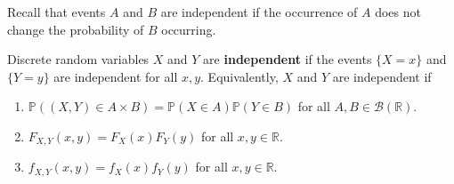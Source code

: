 \documentclass{huhtakm-template-book}
\newcommand{\prob}{\mathbb{P}}
\begin{document}
Recall that events $A$ and $B$ are independent if the occurrence of $A$ does not change the probability of $B$ occurring.
\begin{defn}
	Discrete random variables $X$ and $Y$ are \textbf{independent} if the events $\{X=x\}$ and $\{Y=y\}$ are independent for all $x,y$. Equivalently, $X$ and $Y$ are independent if
	\begin{enumerate}
		\item $\prob((X,Y)\in A\times B)=\prob(X\in A)\prob(Y\in B)$ for all $A,B\in\mathcal{B}(\mathbb{R})$.
		\item $F_{X,Y}(x,y)=F_{X}(x)F_{Y}(y)$ for all $x,y\in\mathbb{R}$.
		\item $f_{X,Y}(x,y)=f_{X}(x)f_{Y}(y)$ for all $x,y\in\mathbb{R}$.
	\end{enumerate}
\end{defn}
\end{document}
